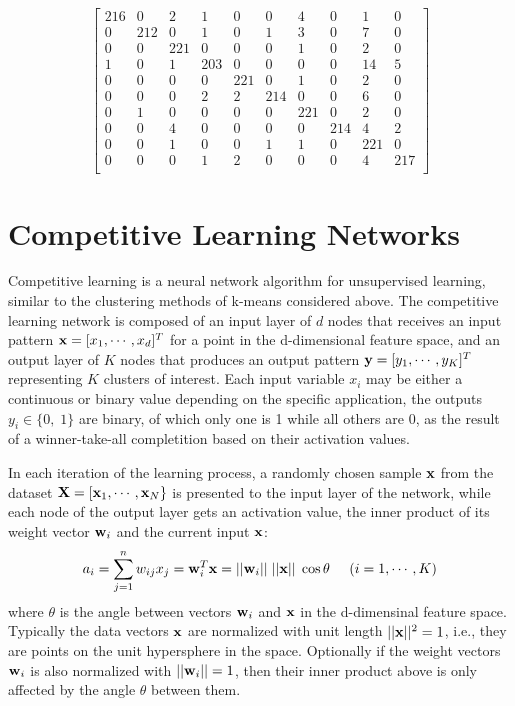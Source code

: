 \documentclass{article}
\begin{document}
\begin{equation}
\left[ \begin{array}{rrrrrrrrrr}
216 & 0 & 2 & 1 & 0 & 0 & 4 & 0 & 1 &  0 \\
  0 & 212 & 0 & 1 & 0 & 1 & 3 & 0 & 7 & 0 \\
  0 & 0 & 221 & 0 & 0 & 0 & 1 & 0 & 2 & 0 \\
  1 & 0 & 1 & 203 & 0 & 0 & 0 & 0 & 14& 5 \\
  0 & 0 & 0 & 0 & 221 & 0 & 1 & 0 & 2 & 0 \\
  0 & 0 & 0 & 2 & 2 & 214 & 0 & 0 & 6 & 0 \\
  0 & 1 & 0 & 0 & 0 & 0 & 221 & 0 & 2 & 0 \\
  0 & 0 & 4 & 0 & 0 & 0 & 0 & 214 & 4 & 2 \\
  0 & 0 & 1 & 0 & 0 & 1 & 1 & 0 & 221 & 0 \\
  0 & 0 & 0 & 1 & 2 & 0 & 0 & 0 & 4 & 217 \\
  \end{array}\right]
\end{equation}



\section{Competitive Learning Networks}


Competitive learning is a neural network algorithm for unsupervised 
learning, similar to the clustering methods of k-means considered 
above. The competitive learning network is composed of an input
layer of $d$ nodes that receives an input pattern 
${\bf x}=[x_1,\cdots,x_d]^T$ for a point in the d-dimensional feature
space, and an output layer of $K$ nodes that produces an output
pattern ${\bf y}=[y_1,\cdots,y_K]^T$ representing $K$ clusters of 
interest. Each input variable $x_i$ may be either a continuous or 
binary value depending on the specific application, the outputs
$y_i\in\{0,\;1\}$ are binary, of which only one is 1 while all others
are 0, as the result of a winner-take-all completition based on their 
activation values.

In each iteration of the learning process, a randomly chosen sample
${\bf x}$ from the dataset ${\bf X}=[{\bf x}_1,\cdots,{\bf x}_N\}$
is presented to the input layer of the network, while each node of 
the output layer gets an activation value, the inner product of its 
weight vector ${\bf w}_i$ and the current input ${\bf x}$:
\begin{equation}	
  a_i=\sum_{j=1}^n w_{ij} x_j={\bf w}_i^T{\bf x}
  =||{\bf w}_i||\;||{\bf x}||\;\cos\theta
  \;\;\;\;\;(i=1,\cdots,K)
\end{equation}
where $\theta$ is the angle between vectors ${\bf w}_i$ and ${\bf x}$
in the d-dimensinal feature space. Typically the data vectors ${\bf x}$ 
are normalized with unit length $||{\bf x}||^2=1$, i.e., they are points 
on the unit hypersphere in the space. Optionally if the weight vectors 
${\bf w}_i$ is also normalized with $||{\bf w}_i||=1$, then their inner 
product above is only affected by the angle $\theta$ between them.
\end{document}
